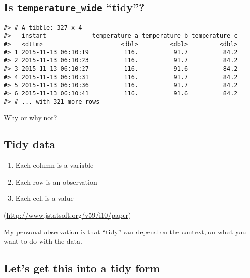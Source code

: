 \documentclass[]{book}
\providecommand{\tightlist}{%
  \setlength{\itemsep}{0pt}\setlength{\parskip}{0pt}}
\begin{document}
\hypertarget{is-temperature_wide-tidy}{%
\subsection{\texorpdfstring{Is \texttt{temperature\_wide} ``tidy''?}{Is temperature\_wide ``tidy''?}}\label{is-temperature_wide-tidy}}

\begin{verbatim}
#> # A tibble: 327 x 4
#>   instant             temperature_a temperature_b temperature_c
#>   <dttm>                      <dbl>         <dbl>         <dbl>
#> 1 2015-11-13 06:10:19          116.          91.7          84.2
#> 2 2015-11-13 06:10:23          116.          91.7          84.2
#> 3 2015-11-13 06:10:27          116.          91.6          84.2
#> 4 2015-11-13 06:10:31          116.          91.7          84.2
#> 5 2015-11-13 06:10:36          116.          91.7          84.2
#> 6 2015-11-13 06:10:41          116.          91.6          84.2
#> # ... with 321 more rows
\end{verbatim}

Why or why not?

\hypertarget{tidy-data}{%
\subsection{Tidy data}\label{tidy-data}}

\begin{enumerate}
\def\labelenumi{\arabic{enumi}.}
\tightlist
\item
  Each column is a variable
\item
  Each row is an observation
\item
  Each cell is a value
\end{enumerate}

(\url{http://www.jstatsoft.org/v59/i10/paper})

My personal observation is that ``tidy'' can depend on the context, on what you want to do with the data.

\hypertarget{lets-get-this-into-a-tidy-form}{%
\subsection{Let's get this into a tidy form}\label{lets-get-this-into-a-tidy-form}}
\end{document}
